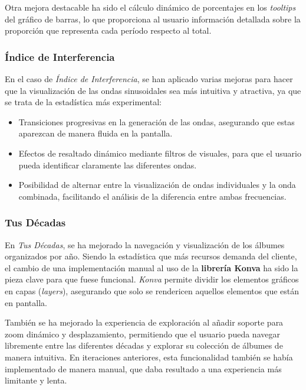 Otra mejora destacable ha sido el cálculo dinámico de porcentajes en los \textit{tooltips} del gráfico de barras, lo que proporciona al usuario información detallada sobre la proporción que representa cada período respecto al total.

\subsubsection*{Índice de Interferencia}

En el caso de \textit{Índice de Interferencia}, se han aplicado varias mejoras para hacer que la visualización de las ondas sinusoidales sea más intuitiva y atractiva, ya que se trata de la estadística más experimental:

\begin{itemize}
    \item Transiciones progresivas en la generación de las ondas, asegurando que estas aparezcan de manera fluida en la pantalla.
    \item Efectos de resaltado dinámico mediante filtros de visuales, para que el usuario pueda identificar claramente las diferentes ondas.
    \item Posibilidad de alternar entre la visualización de ondas individuales y la onda combinada, facilitando el análisis de la diferencia entre ambas frecuencias.
\end{itemize}

\subsubsection*{Tus Décadas}

En \textit{Tus Décadas}, se ha mejorado la navegación y visualización de los álbumes organizados por año. Siendo la estadística que más recursos demanda del cliente, el cambio de una implementación manual al uso de la \textbf{librería Konva} ha sido la pieza clave para que fuese funcional. \textit{Konva} permite dividir los elementos gráficos en capas (\textit{layers}), asegurando que solo se rendericen aquellos elementos que están en pantalla.

También se ha mejorado la experiencia de exploración al añadir soporte para zoom dinámico y desplazamiento, permitiendo que el usuario pueda navegar libremente entre las diferentes décadas y explorar su colección de álbumes de manera intuitiva. En iteraciones anteriores, esta funcionalidad también se había implementado de manera manual, que daba resultado a una experiencia más limitante y lenta.

